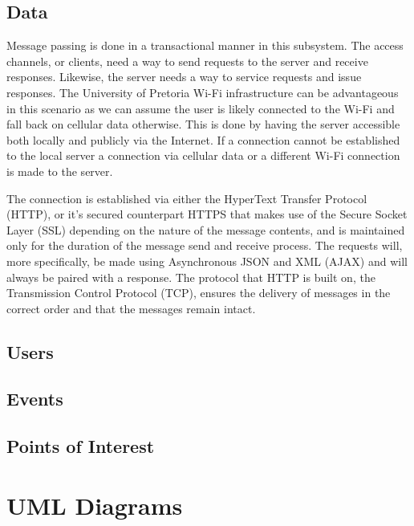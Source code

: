 \documentclass[11pt]{article}
\begin{document}
	\subsection{Data}
	Message passing is done in a transactional manner in this subsystem. The access channels, or clients, need a way to send requests to the server and receive responses. Likewise, the server needs a way to service requests and issue responses. The University of Pretoria Wi-Fi infrastructure can be advantageous in this scenario as we can assume the user is likely connected to the Wi-Fi and fall back on cellular data otherwise. This is done by having the server accessible both locally and publicly via the Internet. If a connection cannot be established to the local server a connection via cellular data or a different Wi-Fi connection is made to the server.
	
	The connection is established via either the HyperText Transfer Protocol (HTTP), or it's secured counterpart HTTPS that makes use of the Secure Socket Layer (SSL) depending on the nature of the message contents, and is maintained only for the duration of the message send and receive process. The requests will, more specifically, be made using Asynchronous JSON and XML (AJAX) and will always be paired with a response. The protocol that HTTP is built on, the Transmission Control Protocol (TCP), ensures the delivery of messages in the correct order and that the messages remain intact.
	\subsection{Users}
	\subsection{Events}
	\subsection{Points of Interest}
	
	\section{UML Diagrams}
\end{document}

